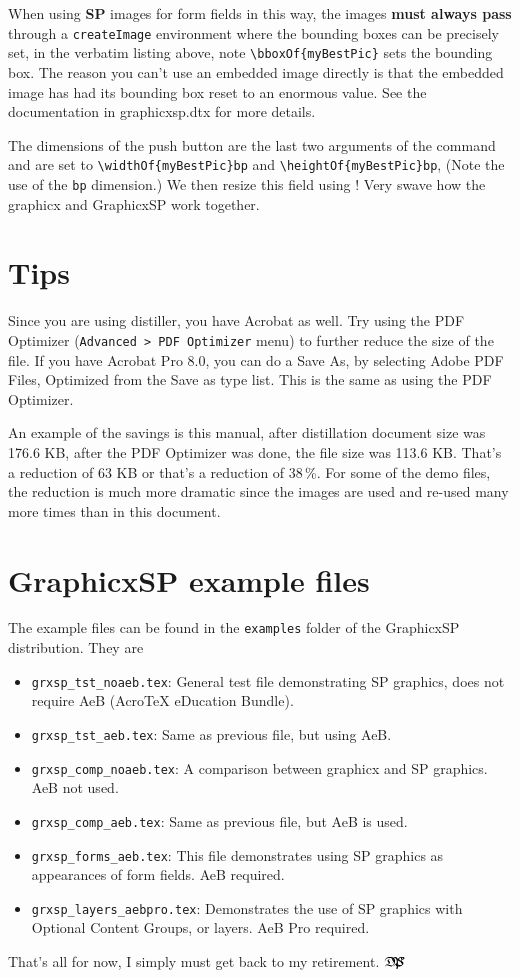 \documentclass{article}
\let\pkg\textsf
\def\dps{$\hbox{$\mathfrak D$\kern-.3em\hbox{$\mathfrak P$}%
   \kern-.6em \hbox{$\mathcal S$}}$}
\begin{document}
When using \textbf{SP} images for form fields in this way, the images
\textbf{must always pass} through a \texttt{createImage} environment where the
bounding boxes can be precisely set, in the verbatim listing above,
note \verb!\bboxOf{myBestPic}! sets the bounding box. The reason you
can't use an embedded image directly is that the embedded image has
had its bounding box reset to an enormous value. See the
documentation in graphicxsp.dtx for more details.

The dimensions of the push button are the last two arguments of the
 command and are set to \verb!\widthOf{myBestPic}bp!
and \verb!\heightOf{myBestPic}bp!, (Note the use of the \texttt{bp}
dimension.)  We then resize this field using ! Very
swave how the graphicx and \pkg{GraphicxSP} work together.

\section{Tips}

Since you are using distiller, you have Acrobat as well. Try using
the PDF Optimizer (\texttt{Advanced > PDF Optimizer} menu) to
further reduce the size of the file. If you have Acrobat Pro 8.0,
you can do a Save As, by selecting Adobe PDF Files, Optimized from
the Save as type list. This is the same as using the PDF Optimizer.

An example of the savings is this manual, after distillation
document size was 176.6 KB, after the PDF Optimizer was done, the
file size was 113.6 KB. That's a reduction of 63 KB or that's a
reduction of 38\,\%. For some of the demo files, the reduction is
much more dramatic since the images are used and re-used many more
times than in this document.


\section{\texorpdfstring{\protect\pkg{GraphicxSP}}{GraphicxSP} example files}

The example files can be found in the \texttt{examples} folder of the \pkg{GraphicxSP}
distribution. They are
\begin{itemize}
\item \texttt{grxsp\_tst\_noaeb.tex}: General test file demonstrating SP graphics,
    does not require AeB (Acro\negthinspace\TeX{} eDucation Bundle).
\item \texttt{grxsp\_tst\_aeb.tex}: Same as previous file, but using AeB.
\item \texttt{grxsp\_comp\_noaeb.tex}: A comparison between graphicx 
    and SP graphics. AeB not used.
\item \texttt{grxsp\_comp\_aeb.tex}: Same as previous file, but AeB is used.
\item \texttt{grxsp\_forms\_aeb.tex}: This file demonstrates using SP graphics as appearances
    of form fields. AeB required.
\item \texttt{grxsp\_layers\_aebpro.tex}: Demonstrates the use of SP graphics with
    Optional Content Groups, or layers. AeB Pro required.
\end{itemize}

\noindent
That's all for now, I simply must get back to my retirement. \dps
\end{document}
